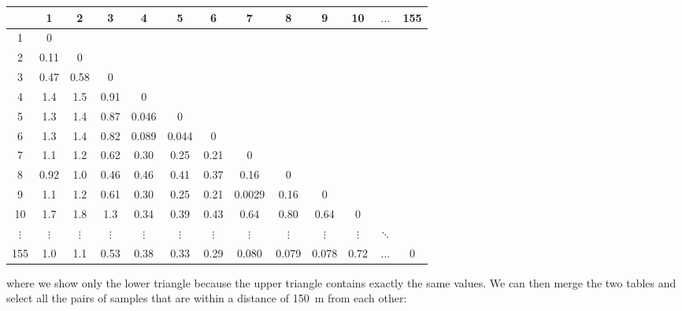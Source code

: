 \begin{center}
\begin{tabular}{c|cccccccccccc}
~ & 1 & 2 & 3 & 4 & 5 & 6 & 7 & 8 & 9 & 10& $\ldots$ & 155\\ \hline
1 & 0 & ~ & ~ & ~ & ~ & ~ & ~ & ~ & ~ & ~ & ~ & ~ \\
2 & 0.11 & 0 & ~ & ~ & ~ & ~ & ~ & ~ & ~ & ~ & ~ & ~ \\
3 & 0.47 & 0.58 & 0 & ~ & ~ & ~ & ~ & ~ & ~ & ~ & ~ & ~ \\
4 & 1.4 & 1.5 & 0.91 & 0 & ~ & ~ & ~ & ~ & ~ & ~ & ~ & ~ \\
5 & 1.3 & 1.4 & 0.87 & 0.046 & 0 & ~ & ~ & ~ & ~ & ~ & ~ & ~ \\
6 & 1.3 & 1.4 & 0.82 & 0.089 & 0.044 & 0 & ~ & ~ & ~ & ~ & ~ & ~ \\
7 & 1.1 & 1.2 & 0.62 & 0.30 & 0.25 & 0.21 & 0 & ~ & ~ & ~ & ~ & ~ \\
8 & 0.92 & 1.0 & 0.46 & 0.46 & 0.41 & 0.37 & 0.16 & 0 & ~ & ~ & ~ & ~ \\
9 & 1.1 & 1.2 & 0.61 & 0.30 & 0.25 & 0.21 & 0.0029 & 0.16 & 0 & ~ & ~ & ~ \\
10& 1.7 & 1.8 & 1.3 & 0.34 & 0.39 & 0.43 & 0.64 & 0.80 & 0.64 & 0 & ~ & ~ \\
$\vdots$ & $\vdots$ & $\vdots$ & $\vdots$ & $\vdots$ & $\vdots$ &
$\vdots$ & $\vdots$ & $\vdots$ & $\vdots$ & $\vdots$ & $\ddots$ & ~ \\
155 & 1.0 & 1.1 & 0.53 & 0.38 & 0.33 & 0.29 & 0.080 & 0.079 & 0.078 & 0.72 & $\ldots$ & 0\\
\end{tabular}
\end{center}

\noindent where we show only the lower triangle because the upper
triangle contains exactly the same values. We can then merge the two
tables and select all the pairs of samples that are within a distance
of 150~m from each other:

